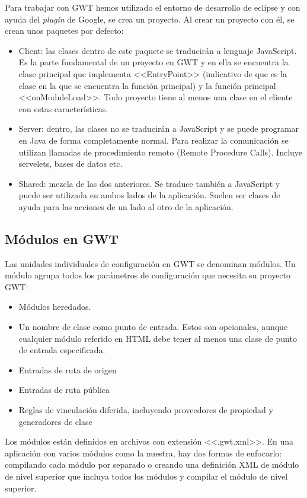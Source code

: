Para trabajar con GWT hemos utilizado el entorno de desarrollo de eclipse y con ayuda del \emph{plugin} de Google, se crea un proyecto. Al crear un proyecto con él, se crean unos paquetes por defecto:
\begin{itemize}
\item Client: las clases dentro de este paquete se traducirán a lenguaje JavaScript. Es la parte fundamental de un proyecto en GWT y en ella se encuentra la clase principal que implementa <<EntryPoint>>  (indicativo de que es la clase en la que se encuentra la función principal) y la función principal <<onModuleLoad>>. Todo proyecto tiene al menos una clase en el cliente con estas características.
\item Server: dentro, las clases no se traducirán a JavaScript y se puede programar en Java de forma completamente normal. Para realizar la comunicación se utilizan llamadas de procedimiento remoto (Remote Procedure Calls). Incluye servelets, bases de datos etc.
\item Shared: mezcla de las dos anteriores. Se traduce también a JavaScript y puede ser utilizada en ambos lados de la aplicación. Suelen ser clases de ayuda para las acciones de un lado al otro de la aplicación.
\end{itemize}

\subsection{Módulos en GWT}

Las unidades individuales de configuración en GWT se denominan módulos. Un módulo agrupa todos los parámetros de configuración que necesita su proyecto GWT:

\begin{itemize}

\item Módulos heredados.
\item Un nombre de clase como punto de entrada. Estos son opcionales, aunque cualquier módulo referido en HTML debe tener al menos una clase de punto de entrada especificada.
\item Entradas de ruta de origen
\item Entradas de ruta pública
\item Reglas de vinculación diferida, incluyendo proveedores de propiedad y generadores de clase

\end{itemize}
Los módulos están definidos en archivos con extensión <<.gwt.xml>>. En una aplicación con varios módulos como la nuestra, hay dos formas de enfocarlo: compilando cada módulo por separado o creando una definición XML de módulo de nivel superior que incluya todos los módulos y compilar el módulo de nivel superior.

